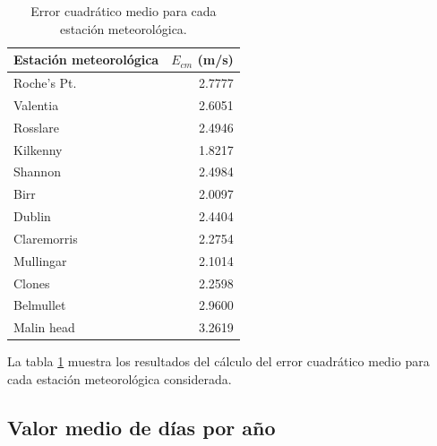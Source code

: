 \documentclass[journal, monochrome]{IEEEtran}
\begin{document}
\begin{table}
	\begin{center}
		\begin{tabular}{l|r}
			Estación meteorológica & $E_{cm}$ (m/s) \\
			\hline
			Roche's Pt. & 2.7777 \\ 
			Valentia & 2.6051 \\
			Rosslare & 2.4946 \\
			Kilkenny & 1.8217 \\
			Shannon & 2.4984 \\
			Birr & 2.0097 \\
			Dublin & 2.4404 \\
			Claremorris & 2.2754 \\
			Mullingar & 2.1014 \\
			Clones & 2.2598 \\
			Belmullet & 2.9600 \\
			Malin head & 3.2619 \\
		\end{tabular}
		\caption{Error cuadrático medio para cada estación meteorológica.}
		\label{table:ecm}
	\end{center}
\end{table}

\vspace{0.5cm}
\par
La tabla \ref{table:ecm} muestra los resultados del cálculo del error cuadrático medio para cada estación meteorológica considerada.

\subsection{Valor medio de días por año}
\end{document}
